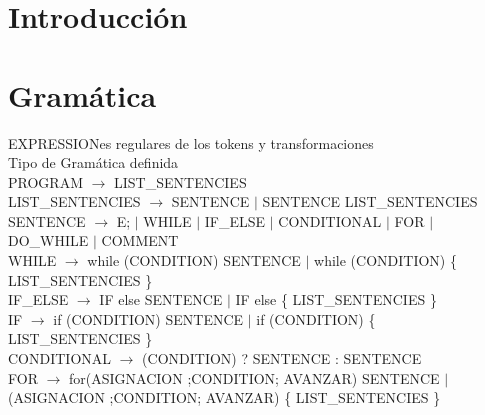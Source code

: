 \documentclass[10pt,a4paper]{article}
\begin{document}

\fecha{\today}



\maketitle

\tableofcontents

\newpage
\section{Introducción}

\section{Gramática}
EXPRESSIONes regulares de los tokens y transformaciones\\
Tipo de Gramática definida \\


PROGRAM $\rightarrow$ LIST\_SENTENCIES \\

LIST\_SENTENCIES $\rightarrow$ SENTENCE $|$ SENTENCE LIST\_SENTENCIES\\

SENTENCE $\rightarrow$ E; $|$ WHILE $|$ IF\_ELSE $|$ CONDITIONAL $|$ FOR $|$ DO\_WHILE $|$ COMMENT \\

WHILE $\rightarrow$ while (CONDITION) SENTENCE $|$ while (CONDITION) \{ LIST\_SENTENCIES \} \\

IF\_ELSE $\rightarrow$ IF else SENTENCE $|$ IF else \{ LIST\_SENTENCIES \} \\

IF $\rightarrow$ if (CONDITION) SENTENCE $|$ if (CONDITION) \{ LIST\_SENTENCIES \} \\

CONDITIONAL $\rightarrow$ (CONDITION) ? SENTENCE : SENTENCE \\

FOR $\rightarrow$ for(ASIGNACION ;CONDITION; AVANZAR) SENTENCE $|$ (ASIGNACION ;CONDITION; AVANZAR) \{ LIST\_SENTENCIES \} \\
\end{document}
